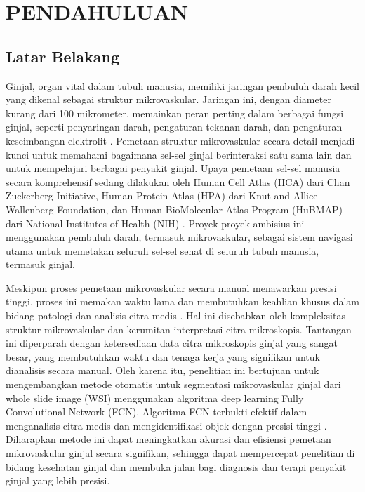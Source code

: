 \chapter{PENDAHULUAN}
\section{Latar Belakang}
\label{section:latarbelakang}
\noindent Ginjal, organ vital dalam tubuh manusia, memiliki jaringan pembuluh darah kecil yang dikenal sebagai struktur mikrovaskular. Jaringan ini, dengan diameter kurang dari 100 mikrometer, memainkan peran penting dalam berbagai fungsi ginjal, seperti penyaringan darah, pengaturan tekanan darah, dan pengaturan keseimbangan elektrolit \cite{hu_multi-scale_2023}. Pemetaan struktur mikrovaskular secara detail menjadi kunci untuk memahami bagaimana sel-sel ginjal berinteraksi satu sama lain dan untuk mempelajari berbagai penyakit ginjal.
Upaya pemetaan sel-sel manusia secara komprehensif sedang dilakukan oleh Human Cell Atlas (HCA) dari Chan Zuckerberg Initiative, Human Protein Atlas (HPA) dari Knut and Allice Wallenberg Foundation, dan Human BioMolecular Atlas Program (HuBMAP) dari National Institutes of Health (NIH) \cite{weber_considerations_2020}. Proyek-proyek ambisius ini menggunakan pembuluh darah, termasuk mikrovaskular, sebagai sistem navigasi utama untuk memetakan seluruh sel-sel sehat di seluruh tubuh manusia, termasuk ginjal.

\noindent Meskipun proses pemetaan mikrovaskular secara manual menawarkan presisi tinggi, proses ini memakan waktu lama dan membutuhkan keahlian khusus dalam bidang patologi dan analisis citra medis \cite{hu_multi-scale_2023,weber_considerations_2020}. Hal ini disebabkan oleh kompleksitas struktur mikrovaskular dan kerumitan interpretasi citra mikroskopis. Tantangan ini diperparah dengan ketersediaan data citra mikroskopis ginjal yang sangat besar, yang membutuhkan waktu dan tenaga kerja yang signifikan untuk dianalisis secara manual. Oleh karena itu, penelitian ini bertujuan untuk mengembangkan metode otomatis untuk segmentasi mikrovaskular ginjal dari whole slide image (WSI) menggunakan algoritma deep learning Fully Convolutional Network (FCN). Algoritma FCN terbukti efektif dalam menganalisis citra medis dan mengidentifikasi objek dengan presisi tinggi \cite{huang_fully_2022}. Diharapkan metode ini dapat meningkatkan akurasi dan efisiensi pemetaan mikrovaskular ginjal secara signifikan, sehingga dapat mempercepat penelitian di bidang kesehatan ginjal dan membuka jalan bagi diagnosis dan terapi penyakit ginjal yang lebih presisi. 

